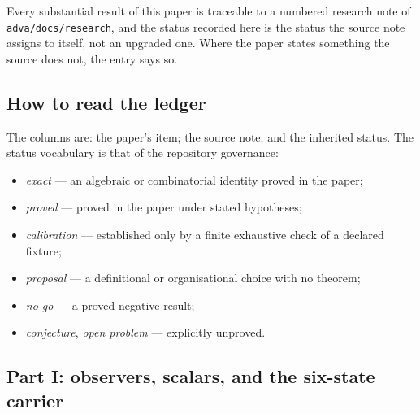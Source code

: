 \label{app:ledger-body}

Every substantial result of this paper is traceable to a numbered research note of
\texttt{adva/docs/research}, and the status recorded here is the status the source note
assigns to itself, not an upgraded one.  Where the paper states something the source does
not, the entry says so.

\subsection{How to read the ledger}

The columns are: the paper's item; the source note; and the inherited status.  The status
vocabulary is that of the repository governance:

\begin{itemize}
\item \emph{exact} --- an algebraic or combinatorial identity proved in the paper;
\item \emph{proved} --- proved in the paper under stated hypotheses;
\item \emph{calibration} --- established only by a finite exhaustive check of a declared
  fixture;
\item \emph{proposal} --- a definitional or organisational choice with no theorem;
\item \emph{no-go} --- a proved negative result;
\item \emph{conjecture}, \emph{open problem} --- explicitly unproved.
\end{itemize}

\subsection{Part I: observers, scalars, and the six-state carrier}

